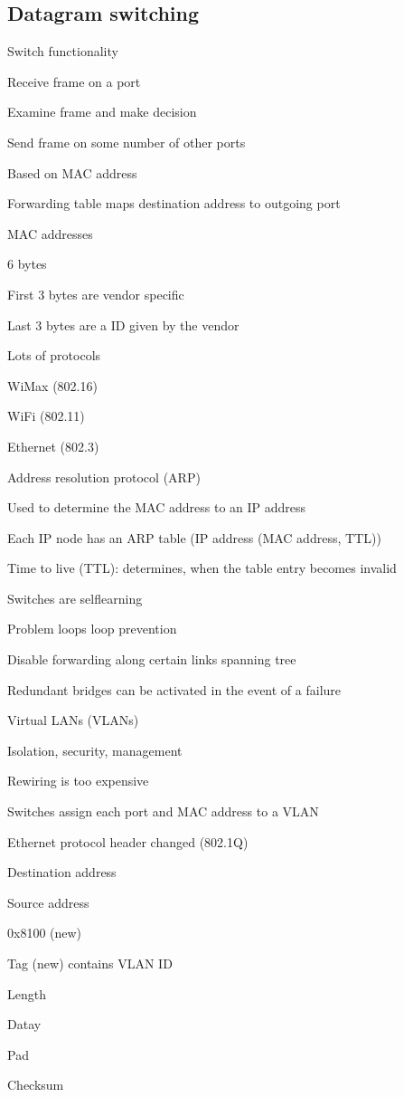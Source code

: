 \subsection{Datagram switching}
\enumstart
	\item Switch functionality
	\enumstart
		\item Receive frame on a port
		\item Examine frame and make decision
		\item Send frame on some number of other ports
	\enumend
	\item Based on MAC address
	\item Forwarding table maps destination address to outgoing port
	\item MAC addresses
	\enumstart
		\item 6 bytes
		\item First 3 bytes are vendor specific
		\item Last 3 bytes are a ID given by the vendor
	\enumend
	\item Lots of protocols
	\enumstart
		\item WiMax (802.16)
		\item WiFi (802.11)
		\item Ethernet (802.3)
	\enumend
	\item Address resolution protocol (ARP)
	\enumstart
		\item Used to determine the MAC address to an IP address
		\item Each IP node has an ARP table (IP address \arrow (MAC address, TTL))
		\item Time to live (TTL): determines, when the table entry becomes invalid
	\enumend
	\item Switches are selflearning
	\item Problem loops \arrow loop prevention
	\enumstart
		\item Disable forwarding along certain links \arrow spanning tree
		\item Redundant bridges can be activated in the event of a failure
	\enumend
	\item Virtual LANs (VLANs)
	\enumstart
		\item Isolation, security, management
		\item Rewiring is too expensive
		\item Switches assign each port and MAC address to a VLAN
		\item Ethernet protocol header changed (802.1Q)
		\enumstart
			\item Destination address
			\item Source address
			\item 0x8100 (new)
			\item Tag (new) \arrow contains VLAN ID
			\item Length
			\item Datay
			\item Pad
			\item Checksum
		\enumend
	\enumend
\enumend
